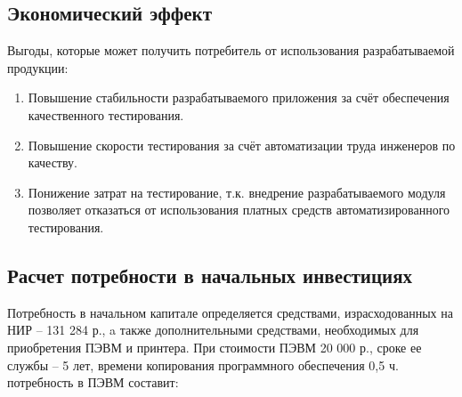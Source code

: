 \subsection{Экономический эффект}

Выгоды, которые может получить потребитель от использования разрабатываемой продукции:

\begin{enumerate}
\item Повышение стабильности разрабатываемого приложения за счёт обеспечения качественного тестирования.
\item Повышение скорости тестирования за счёт автоматизации труда инженеров по качеству.
\item Понижение затрат на тестирование, т.к. внедрение разрабатываемого модуля позволяет отказаться от
использования платных средств автоматизированного тестирования.
\end{enumerate}

\subsection{Расчет потребности в начальных инвестициях}

Потребность в начальном капитале определяется средствами, израсходованных на НИР – 131 284 р.,
a также дополнительными средствами, необходимых для приобретения ПЭВМ и принтера. При стоимости ПЭВМ 20 000 р.,
сроке ее службы – 5 лет, времени копирования программного обеспечения 0,5 ч. потребность в ПЭВМ составит: